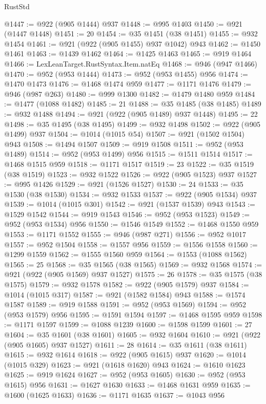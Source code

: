\begin{lexlean}{RustStd}
\begin{coremodule}
@1447 := @922 (@905 @1444) @937
@1448 := @995 @1403
@1450 := @921 (@1447 @1448)
@1451 := 20
@1454 := @35 @1451 (@38 @1451)
@1455 := @932 @1454
@1461 := @921 (@922 (@905 @1455) @937 @1042) @943
@1462 := @1450 @1461
@1463 := @1439 @1462
@1464 := @1425 @1463
@1465 := @919 @1464
@1466 := LexLeanTarget.RustSyntax.Item.natEq
@1468 := @946 (@947 @1466)
@1470 := @952 (@953 @1444)
@1473 := @952 (@953 @1455) @956
@1474 := @1470 @1473
@1476 := @1468 @1474 @959
@1477 := @1171 @1476
@1479 := @946 (@987 @263)
@1480 := @999 @1300
@1482 := @1479 @1480 @959
@1484 := @1477 (@1088 @1482)
@1485 := 21
@1488 := @35 @1485 (@38 @1485)
@1489 := @932 @1488
@1494 := @921 (@922 (@905 @1489) @937 @1448)
@1495 := 22
@1498 := @35 @1495 (@38 @1495)
@1499 := @932 @1498
@1502 := @922 (@905 @1499) @937
@1504 := @1014 (@1015 @54)
@1507 := @921 (@1502 @1504) @943
@1508 := @1494 @1507
@1509 := @919 @1508
@1511 := @952 (@953 @1489)
@1514 := @952 (@953 @1499) @956
@1515 := @1511 @1514
@1517 := @1468 @1515 @959
@1518 := @1171 @1517
@1519 := 23
@1522 := @35 @1519 (@38 @1519)
@1523 := @932 @1522
@1526 := @922 (@905 @1523) @937
@1527 := @995 @1426
@1529 := @921 (@1526 @1527)
@1530 := 24
@1533 := @35 @1530 (@38 @1530)
@1534 := @932 @1533
@1537 := @922 (@905 @1534) @937
@1539 := @1014 (@1015 @301)
@1542 := @921 (@1537 @1539) @943
@1543 := @1529 @1542
@1544 := @919 @1543
@1546 := @952 (@953 @1523)
@1549 := @952 (@953 @1534) @956
@1550 := @1546 @1549
@1552 := @1468 @1550 @959
@1553 := @1171 @1552
@1555 := @946 (@987 @271)
@1556 := @952 @1017
@1557 := @952 @1504
@1558 := @1557 @956
@1559 := @1556 @1558
@1560 := @1299 @1559
@1562 := @1555 @1560 @959
@1564 := @1553 (@1088 @1562)
@1565 := 25
@1568 := @35 @1565 (@38 @1565)
@1569 := @932 @1568
@1574 := @921 (@922 (@905 @1569) @937 @1527)
@1575 := 26
@1578 := @35 @1575 (@38 @1575)
@1579 := @932 @1578
@1582 := @922 (@905 @1579) @937
@1584 := @1014 (@1015 @317)
@1587 := @921 (@1582 @1584) @943
@1588 := @1574 @1587
@1589 := @919 @1588
@1591 := @952 (@953 @1569)
@1594 := @952 (@953 @1579) @956
@1595 := @1591 @1594
@1597 := @1468 @1595 @959
@1598 := @1171 @1597
@1599 := @1088 @1239
@1600 := @1598 @1599
@1601 := 27
@1604 := @35 @1601 (@38 @1601)
@1605 := @932 @1604
@1610 := @921 (@922 (@905 @1605) @937 @1527)
@1611 := 28
@1614 := @35 @1611 (@38 @1611)
@1615 := @932 @1614
@1618 := @922 (@905 @1615) @937
@1620 := @1014 (@1015 @329)
@1623 := @921 (@1618 @1620) @943
@1624 := @1610 @1623
@1625 := @919 @1624
@1627 := @952 (@953 @1605)
@1630 := @952 (@953 @1615) @956
@1631 := @1627 @1630
@1633 := @1468 @1631 @959
@1635 := @1600 (@1625 @1633)
@1636 := @1171 @1635
@1637 := @1043 @956

\end{coremodule}
\end{lexlean}
